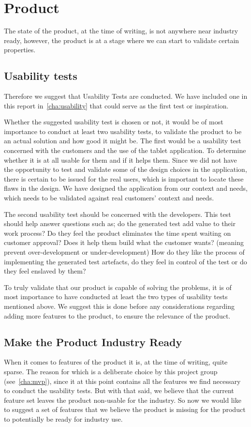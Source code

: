 \section{Product}
The state of the product, at the time of writing, is not anywhere near industry ready, however, the product is at a stage where we can start to validate certain properties.

\subsection{Usability tests}
Therefore we suggest that Usability Tests are conducted.
We have included one in this report in~\autoref{cha:usability} that could serve as the first test or inspiration.

Whether the suggested usability test is chosen or not, it would be of most importance to conduct at least two usability tests, to validate the product to be an actual solution and how good it might be.
The first would be a usability test concerned with the customers and the use of the tablet application.
To determine whether it is at all usable for them and if it helps them.
Since we did not have the opportunity to test and validate some of the design choices in the application, there is certain to be issued for the real users, which is important to locate these flaws in the design.
We have designed the application from our context and needs, which needs to be validated against real customers' context and needs.

The second usability test should be concerned with the developers.
This test should help answer questions such as; do the generated test add value to their work process? 
Do they feel the product eliminates the time spent waiting on customer approval?
Does it help them build what the customer wants? (meaning prevent over-development or under-development)
How do they like the process of implementing the generated test artefacts, do they feel in control of the test or do they feel enslaved by them?

To truly validate that our product is capable of solving the problems, it is of most importance to have conducted at least the two types of usability tests mentioned above.
We suggest this is done before any considerations regarding adding more features to the product, to ensure the relevance of the product.

\subsection{Make the Product Industry Ready}
When it comes to features of the product it is, at the time of writing, quite sparse.
The reason for which is a deliberate choice by this project group (see~\autoref{cha:mvp}), since it at this point contains all the features we find necessary to conduct the usability tests.
But with that said, we believe that the current feature set leaves the product non-usable for the industry.
So now we would like to suggest a set of features that we believe the product is missing for the product to potentially be ready for industry use.

